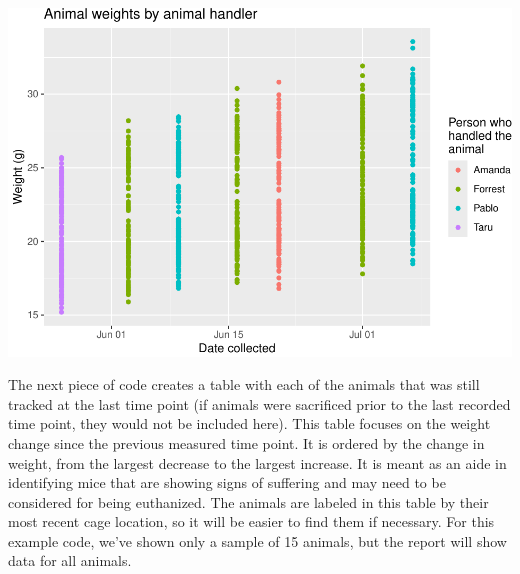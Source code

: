\documentclass[
]{book}
\begin{document}
\includegraphics{csu-impactb_files/figure-latex/unnamed-chunk-17-1.pdf}

The next piece of code creates a table with each of the animals that was still
tracked at the last time point (if animals were sacrificed prior to the last
recorded time point, they would not be included here). This table focuses on the
weight change since the previous measured time point. It is ordered by the
change in weight, from the largest decrease to the largest increase. It is meant
as an aide in identifying mice that are showing signs of suffering and may need
to be considered for being euthanized. The animals are labeled in this table by
their most recent cage location, so it will be easier to find them if necessary.
For this example code, we've shown only a sample of 15 animals, but the report
will show data for all animals.
\end{document}
